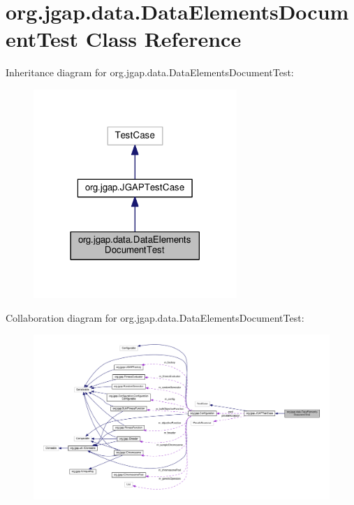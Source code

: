 \hypertarget{classorg_1_1jgap_1_1data_1_1_data_elements_document_test}{\section{org.\-jgap.\-data.\-Data\-Elements\-Document\-Test Class Reference}
\label{classorg_1_1jgap_1_1data_1_1_data_elements_document_test}
}


Inheritance diagram for org.\-jgap.\-data.\-Data\-Elements\-Document\-Test\-:
\nopagebreak
\begin{figure}[H]
\begin{center}
\leavevmode
\includegraphics[width=218pt]{classorg_1_1jgap_1_1data_1_1_data_elements_document_test__inherit__graph}
\end{center}
\end{figure}


Collaboration diagram for org.\-jgap.\-data.\-Data\-Elements\-Document\-Test\-:
\nopagebreak
\begin{figure}[H]
\begin{center}
\leavevmode
\includegraphics[width=350pt]{classorg_1_1jgap_1_1data_1_1_data_elements_document_test__coll__graph}
\end{center}
\end{figure}
